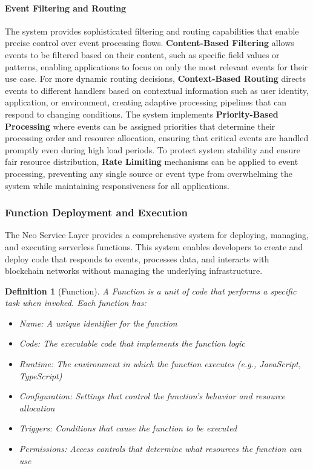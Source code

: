 \documentclass[11pt]{article}
\newtheorem{definition}{Definition}
\begin{document}
\paragraph{Event Filtering and Routing}
The system provides sophisticated filtering and routing capabilities that enable precise control over event processing flows. \textbf{Content-Based Filtering} allows events to be filtered based on their content, such as specific field values or patterns, enabling applications to focus on only the most relevant events for their use case. For more dynamic routing decisions, \textbf{Context-Based Routing} directs events to different handlers based on contextual information such as user identity, application, or environment, creating adaptive processing pipelines that can respond to changing conditions. The system implements \textbf{Priority-Based Processing} where events can be assigned priorities that determine their processing order and resource allocation, ensuring that critical events are handled promptly even during high load periods. To protect system stability and ensure fair resource distribution, \textbf{Rate Limiting} mechanisms can be applied to event processing, preventing any single source or event type from overwhelming the system while maintaining responsiveness for all applications.

\subsubsection{Function Deployment and Execution}
\label{subsubsec:function-deployment}

The Neo Service Layer provides a comprehensive system for deploying, managing, and executing serverless functions. This system enables developers to create and deploy code that responds to events, processes data, and interacts with blockchain networks without managing the underlying infrastructure.



\begin{definition}[Function]
A Function is a unit of code that performs a specific task when invoked. Each function has:
\begin{itemize}
    \item Name: A unique identifier for the function
    \item Code: The executable code that implements the function logic
    \item Runtime: The environment in which the function executes (e.g., JavaScript, TypeScript)
    \item Configuration: Settings that control the function's behavior and resource allocation
    \item Triggers: Conditions that cause the function to be executed
    \item Permissions: Access controls that determine what resources the function can use
\end{itemize}
\end{definition}
\end{document}
